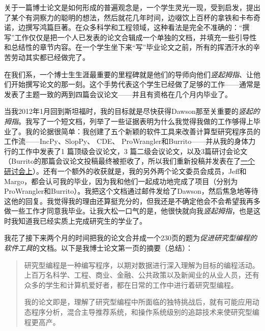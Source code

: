 \documentclass[letter,12pt]{book}
\begin{document}
\begin{CJK}{UTF8}{gbsn}
\breakline

关于一篇博士论文是如何形成的普遍观念是，一个学生灵光一现，受到启发，提出了某个有洞察力的聪明的想法，然后就花几年时间，边啜饮上百杯的拿铁和卡布奇诺，边撰写鸿篇巨著。在众多科学和工程领域，这种看法是完全不准确的：“撰写”工作仅仅是把一个人已发表的论文合辑成一个单独的文档，并填充一些引导性和总结性的章节内容。在一个学生坐下来“写”毕业论文之前，所有的挥洒汗水的辛苦劳动其实都已经做完了。

在我们系，一个博士生生涯最重要的里程碑就是他们的导师向他们\emph{竖起拇指}、让他们开始撰写论文的那一刻。这个手势代表这个学生已经做了足够的工作——通常是发表了主题一致的两到四篇会议论文——并且有资格在几个月内毕业了。

当我2012年1月回到斯坦福时，我的目标就是尽快获得Dawson那至关重要的\emph{竖起的拇指}。我写了一个短文档，列举了一些证据表明为什么我觉得我做的工作够得上毕业了。我的论据很简单：我创建了五个新颖的软件工具来改善计算型研究程序员的工作流——IncPy、SlopPy、 CDE、 ProWrangler和Burrito——并从我的身体力行的工作中发表了1 篇顶级会议论文，3 篇二级会议论文，以及3篇研讨会论文（Burrito的那篇会议论文投稿最终被拒收了，所以我们重新投稿并发表在了\href{http://www.pgbovine.net/projects/pubs/guo_burrito_tapp_2012.pdf}{一个研讨会上}）。还有一个额外的收获就是，我的另外两个论文委员会成员，Jeff和Margo，都会认可我的毕业，因为我和他们一起成功地完成了项目（分别为ProWrangler和Burrito）。我把这个文档通过邮件发给了Dawson，然后焦急地等待这他的回复。我觉得我的理由还算挺充分的，但我还是不确定他会不会希望我再多做一些工作才同意我毕业。让我大松一口气的是，他很快就向我\emph{竖起拇指}，也是这时我知道我已经实质上完成研究生的学业了。

我花了接下来两个月的时间把我的论文合并成一个230页的题为\emph{促进研究型编程的软件工具}的文档。以下是我博士论文第一页的摘要（总结）：
\begin{quote}
  研究型编程是一种编写程序，以期对数据进行深入理解为目标的编程活动。上百万名科学、工程、商业、金融、公共政策以及新闻业的从业人员，还有众多的学生和计算机爱好者，都在日常的工作中进行着研究型编程。

  我的论文即是，理解了研究型编程中所面临的独特挑战后，就有可能应用动态程序分析，混合主导推荐系统，和操作系统级别的追踪技术来使研究型编程更高产。


\end{quote}
\end{CJK}
\end{document}
